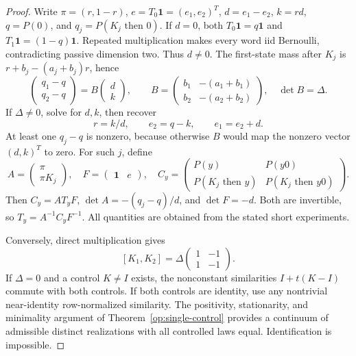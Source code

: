 \begin{proof}
Write \(\pi=(r,1-r)\), \(e=T_0\mathbf1=(e_1,e_2)^T\),
\(d=e_1-e_2\), \(k=rd\), \(q=P(0)\), and
\(q_j=P(K_j\text{ then }0)\).
If \(d=0\), both \(T_0\mathbf1=q\mathbf1\) and
\(T_1\mathbf1=(1-q)\mathbf1\).  Repeated multiplication makes every
word iid Bernoulli, contradicting passive dimension two.  Thus \(d\ne0\).
The first-state mass after \(K_j\) is
\(r+b_j-(a_j+b_j)r\), hence
\[
 \begin{pmatrix}q_1-q\\q_2-q\end{pmatrix}
 =
 B\begin{pmatrix}d\\k\end{pmatrix},\qquad
 B=\begin{pmatrix}
 b_1&-(a_1+b_1)\\ b_2&-(a_2+b_2)
 \end{pmatrix},\quad \det B=\Delta .
\]
If \(\Delta\ne0\), solve for \(d,k\), then recover
\[
 r=k/d,\qquad e_2=q-k,\qquad e_1=e_2+d .
\]
At least one \(q_j-q\) is nonzero, because otherwise \(B\) would map
the nonzero vector \((d,k)^T\) to zero.  For such \(j\), define
\[
 A=\begin{pmatrix}\pi\\\pi K_j\end{pmatrix},\quad
 F=\begin{pmatrix}\mathbf1&e\end{pmatrix},\quad
 C_y=\begin{pmatrix}
 P(y)&P(y0)\\
 P(K_j\text{ then }y)&P(K_j\text{ then }y0)
 \end{pmatrix}.
\]
Then \(C_y=AT_yF\),
\(\det A=-(q_j-q)/d\), and \(\det F=-d\).
Both are invertible, so \(T_y=A^{-1}C_yF^{-1}\).
All quantities are obtained from the stated short experiments.

Conversely, direct multiplication gives
\[
 [K_1,K_2]=\Delta\begin{pmatrix}1&-1\\1&-1\end{pmatrix}.
\]
If \(\Delta=0\) and a control \(K\ne I\) exists, the nonconstant
similarities \(I+t(K-I)\) commute with both controls.
If both controls are identity, use any nontrivial near-identity
row-normalized similarity.  The positivity, stationarity, and
minimality argument of Theorem~\ref{op:single-control} provides a
continuum of admissible distinct realizations with all controlled
laws equal.  Identification is impossible.
\end{proof}

